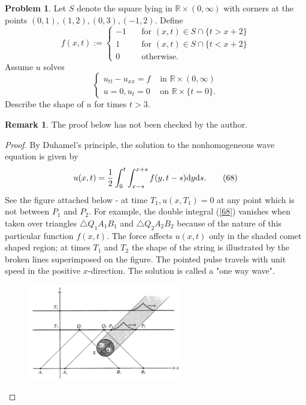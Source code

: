 \documentclass[hyperref,UTF8,12pt]{article}
\numberwithin{equation}{subsection}
\theoremstyle{plain}
\theoremstyle{definition}
\newtheorem{remark}{Remark}
\newtheorem{problem}{Problem}
\numberwithin{theorem}{section}
\numberwithin{lemma}{section}
\numberwithin{proposition}{section}
\numberwithin{remark}{section}
\numberwithin{corollary}{section}
\numberwithin{definition}{section}
\numberwithin{problem}{section}
\numberwithin{example}{section}
\def\dif{\textup{d}}
\newcommand{\mr}{\mathbb{R}}
\begin{document}
\begin{problem}
Let $S$ denote the square lying in $\mr\times(0,\infty)$ with corners at the points $(0,1),(1,2),(0,3),(-1,2)$. Define\[f(x,t):=\left\{\begin{aligned}
	-1&\quad\text{for }(x,t)\in S\cap\{t>x+2\}\\
	1&\quad\text{for }(x,t)\in S\cap\{t<x+2\}\\
	0&\quad\text{otherwise.}
\end{aligned}\right.\]Assume $u$ solves\[\left\{\begin{array}{cl}
	u_{tt}-u_{xx}=f&\text{ in }\mr\times(0,\infty)\\
	u=0,u_t=0&\text{ on }\mr\times\{t=0\}.
\end{array}\right.\]
Describe the shape of $u$ for times $t>3$.
\end{problem}
\begin{remark}
The proof below has not been checked by the author.
\end{remark}
\begin{proof}
By Duhamel's principle, the solution to the nonhomogeneous wave equation is given by
\[u(x,t)=\frac{1}{2}\int_0^t\int_{x-s}^{x+s}f(y,t-s)\dif y\dif s.\tag{68}\label{68}\]See the figure attached below - at time $T_1, u(x,T_1)=0$ at any point which is not between $P_1$ and $P_2$. For example, the double integral (\ref{68}) vanishes when taken over triangles $\triangle Q_1A_1B_1$ and $\triangle Q_2A_2B_2$ because of the nature of this particular function $f(x,t)$. The force affects $u(x,t)$ only in the shaded comet shaped region; at times $T_1$ and $T_2$ the shape of the string is illustrated by the broken lines superimposed on the figure. The pointed pulse travels with unit speed in the positive $x$-direction. The solution is called a "one way wave".
\begin{figure}[h]
	\centering
	\includegraphics[width=0.6\textwidth]{prob23.png}
\end{figure}
\end{proof}
\end{document}
